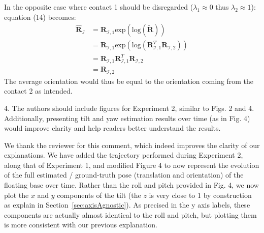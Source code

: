 In the opposite case where contact 1 should be disregarded ($\lambda_{1} \approx 0$ thus $\lambda_{2} \approx 1$): equation (14) becomes: 
\begin{align}
    \hat{\boldsymbol{R}}_{\mathcal{I}}& = \boldsymbol{R}_{\mathcal{I}, 1} \text{exp} \left(  \text{log} \left( \tilde{\boldsymbol{R}}\right)  \right) \\
    & = \boldsymbol{R}_{\mathcal{I}, 1} \text{exp} \left( \text{log} \left( \boldsymbol{R}^{T}_{\mathcal{I}, 1} \boldsymbol{R}_{\mathcal{I}, 2}\right)  \right)\\
    & = \boldsymbol{R}_{\mathcal{I}, 1}  \boldsymbol{R}^{T}_{\mathcal{I}, 1} \boldsymbol{R}_{\mathcal{I}, 2} \\
    & =  \boldsymbol{R}_{\mathcal{I}, 2} 
\end{align} 
The average orientation would thus be equal to the orientation coming from the contact 2 as intended.

\begin{revquote}
4. The authors should include figures for Experiment 2, similar to Figs. 2 and 4. Additionally, presenting tilt and yaw estimation results over time (as in Fig. 4) would improve clarity and help readers better understand the results.
\end{revquote}

We thank the reviewer for this comment, which indeed improves the clarity of our explanations. We have added the trajectory performed during Experiment 2, along that of Experiment 1, and modified Figure 4 to now represent the evolution of the full estimated / ground-truth pose (translation and orientation) of the floating base over time. Rather than the roll and pitch provided in Fig. 4, we now plot the $x$ and $y$ components of the tilt (the $z$ is very close to 1 by construction as explain in Section~\ref{sec:axisAgnostic}). As precised in the y axis labels, these components are actually almost identical to the roll and pitch, but plotting them is more consistent with our previous explanation.